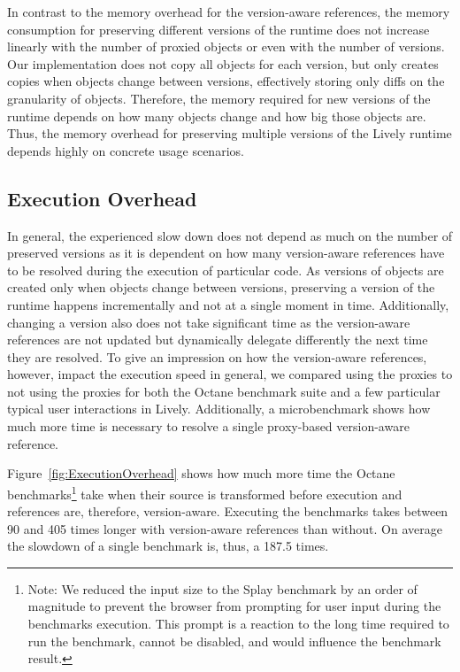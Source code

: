In contrast to the memory overhead for the version-aware references, the memory consumption for preserving different versions of the runtime does not increase linearly with the number of proxied objects or even with the number of versions.
Our implementation does not copy all objects for each version, but only creates copies when objects change between versions, effectively storing only diffs on the granularity of objects.
Therefore, the memory required for new versions of the runtime depends on how many objects change and how big those objects are.
Thus, the memory overhead for preserving multiple versions of the Lively runtime depends highly on concrete usage scenarios.


\subsection{Execution Overhead}

In general, the experienced slow down does not depend as much on the number of preserved versions as it is dependent on how many version-aware references have to be resolved during the execution of particular code.
As versions of objects are created only when objects change between versions, preserving a version of the runtime happens incrementally and not at a single moment in time.
Additionally, changing a version also does not take significant time as the version-aware references are not updated but dynamically delegate differently the next time they are resolved.
To give an impression on how the version-aware references, however, impact the execution speed in general, we compared using the proxies to not using the proxies for both the Octane benchmark suite and a few particular typical user interactions in Lively.
Additionally, a microbenchmark shows how much more time is necessary to resolve a single proxy-based version-aware reference.

Figure~\ref{fig:ExecutionOverhead} shows how much more time the Octane benchmarks\footnote{Note: We reduced the input size to the Splay benchmark by an order of magnitude to prevent the browser from prompting for user input during the benchmarks execution. This prompt is a reaction to the long time required to run the benchmark, cannot be disabled, and would influence the benchmark result.} take when their source is transformed before execution and references are, therefore, version-aware.
Executing the benchmarks takes between 90 and 405 times longer with version-aware references than without.
On average the slowdown of a single benchmark is, thus, a 187.5 times.

